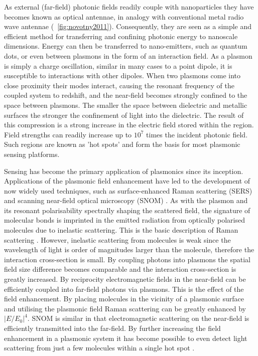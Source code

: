 \documentclass[12pt, a4paper, twoside]{book}
\begin{document}
As external (far-field) photonic fields readily couple with nanoparticles they have becomes known as optical antennae, in analogy with conventional metal radio wave antennae (\figurename~\ref{fig:novotny2011}). Consequently, they are seen as a simple and efficient method for transferring and confining photonic energy to nanoscale dimensions. Energy can then be transferred to nano-emitters, such as quantum dots, or even between plasmons in the form of an interaction field.
As a plasmon is simply a charge oscillation, similar in many cases to a {\color{red}point} dipole, it is susceptible to interactions with other dipoles. When two plasmons come into close proximity their modes interact, causing the resonant frequency of the coupled system to redshift, and the near-field becomes strongly confined to the space between plasmons. The smaller the space between dielectric and metallic surfaces the stronger the confinement of light into the dielectric. The result of this compression is a strong increase in the electric field stored within the region. Field strengths can readily increase up to $10^7$ times the incident photonic field. Such regions are known as 'hot spots' and form the basis for most plasmonic sensing platforms.

Sensing has become the primary application of plasmonics since its inception. Applications of the plasmonic field enhancement have led to the development of now widely used techniques, such as surface-enhanced Raman scattering (SERS) \cite{fleischmann1974, jeanmaire1977} and scanning near-field optical microscopy (SNOM) \cite{}.
As with the plasmon and its resonant polarisability spectrally shaping the scattered field, the signature of molecular bonds is imprinted in the emitted radiation from optically polarised molecules due to inelastic scattering. This is the basic description of Raman scattering \cite{raman1928}. However, inelastic scattering from molecules is weak since the wavelength of light is order of magnitudes larger than the molecule, therefore the interaction cross-section is small. By coupling photons into plasmons the spatial field size difference becomes comparable and the interaction cross-section is greatly increased. By reciprocity electromagnetic fields in the near-field can be efficiently coupled into far-field photons via plasmons. This is the effect of the field enhancement. By placing molecules in the vicinity of a plasmonic surface and utilising the plasmonic field Raman scattering can be greatly enhanced by $\left|E/E_0\right|^4$. SNOM is similar in that electromagnetic scattering on the near-field is efficiently transmitted into the far-field. By further increasing the field enhancement in a plasmonic system it has become possible to even detect light scattering from just a few molecules within a single hot spot \cite{}.
\end{document}
